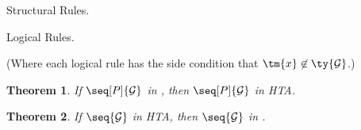 \documentclass[submission,copyright,creativecommons]{eptcs}
\newtheorem{theorem}{Theorem}
\renewcommand*{\hccp}{HTA\xspace}
\begin{document}
\begin{figure*}[!htb]
  Structural Rules.
  \begin{center} \hccpInfAx        \hccpInfCycle \end{center}
  \begin{center} \hccpInfMix       \hccpInfHalt  \end{center}

  Logical Rules.

  \begin{center} \hccpInfBoundTens \hccpInfParr  \end{center}
  \begin{center} \hccpInfOne       \hccpInfBot   \end{center}
  \begin{center}       \end{center}
  \begin{center} \hccpInfWith                    \end{center}
  \begin{center} \hccpInfNil       \hccpInfTop   \end{center}

  \centering
  (Where each logical rule has the side condition that $\tm{x} \not\in \ty{\mathcal{G}}$.)

  \caption{Hypersequent Classical Processes \emph{Taken Apart} (\hccp)}
  \label{fig:hccp}
\end{figure*}

\begin{theorem}\label{thm:hcp2hccp-typing}
  If $\seq[P]{\mathcal{G}}$ in \hcp, then $\seq[P]{\mathcal{G}}$ in \hccp.
\end{theorem}
\begin{theorem}\label{thm:hccp2hcp-typing}
  If $\seq{\mathcal{G}}$ in \hccp, then $\seq{\mathcal{G}}$ in \hcp.
\end{theorem}




\end{document}
